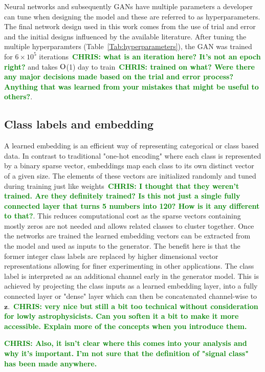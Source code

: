 \documentclass[12pt]{iopart}
\newcommand{\chris}[1]{\textbf{\textcolor{green}{CHRIS: #1}}}
\begin{document}
%
Neural networks and subsequently \acp{GAN} have multiple parameters a developer
can tune when designing the model and these are referred to as hyperparameters.
The final network design used in this work comes from the use of trial and
error and the initial designs influenced by the available literature. After
tuning the multiple hyperparamters (Table~\ref{Tab:hyperparameters}), the GAN
was trained for $6\times 10^5$ iterations~\chris{what is an iteration here?
It's not an epoch right?} and takes $\mathord{\mathrm{O}}$(1) day to train~\chris{trained on
what? Were there any major decisions made based on the trial and error process?
Anything that was learned from your mistakes that might be useful to others?}.

\subsection{Class labels and embedding}

%
A learned embedding is an efficient way of representing categorical or class
based data. In contrast to traditional "one-hot encoding" where each class is
represented by a binary sparse vector, embeddings map each class to its own
distinct vector of a given size. The elements of these vectors are initialized
randomly and tuned during training just like weights~\chris{I thought that they
weren't trained. Are they definitely trained? Is this not just a single fully
connected layer that turns 5 numbers into 120? How is it any different to
that?}. This reduces computational cost as the sparse vectors containing mostly
zeros are not needed and allows related classes to cluster together. Once the
networks are trained the learned embedding vectors can be extracted from the
model and used as inputs to the generator. The benefit here is that the former
integer class labels are replaced by higher dimensional vector representations
allowing for finer experimenting in other applications. The class label is
interpreted as an additional channel early in the generator model. This is
achieved by projecting the class inputs as a learned embedding layer, into a
fully connected layer or "dense" layer which can then be concatenated
channel-wise to $\textbf{z}$.~\chris{very nice but still a bit too technical
without consideration for lowly astrophysicists. Can you soften it a bit to
make it more accessible. Explain more of the concepts when you introduce them.} 

\chris{Also, it isn't clear where this comes into your analysis and why it's
important. I'm not sure that the definition of "signal class" has been made
anywhere.}
\end{document}
